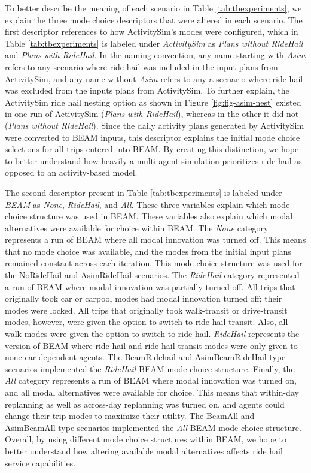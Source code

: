 \documentclass[12pt, oneside, openright]{byuthesis}
\begin{document}
To better describe the meaning of each scenario in Table \ref{tab:tbexperiments}, we explain the three mode choice descriptors that were altered in each scenario. The first descriptor references to how ActivitySim's modes were configured, which in Table \ref{tab:tbexperiments} is labeled under \emph{ActivitySim} as \emph{Plans without RideHail} and \emph{Plans with RideHail}. In the naming convention, any name starting with \emph{Asim} refers to any scenario where ride hail was included in the input plans from ActivitySim, and any name without \emph{Asim} refers to any a scenario where ride hail was excluded from the inputs plans from ActivitySim. To further explain, the ActivitySim ride hail nesting option as shown in Figure \ref{fig:fig-asim-nest} existed in one run of ActivitySim (\emph{Plans with RideHail}), whereas in the other it did not (\emph{Plans without RideHail}). Since the daily activity plans generated by ActivitySim were converted to BEAM inputs, this descriptor explains the initial mode choice selections for all trips entered into BEAM. By creating this distinction, we hope to better understand how heavily a multi-agent simulation prioritizes ride hail as opposed to an activity-based model.

The second descriptor present in Table \ref{tab:tbexperiments} is labeled under \emph{BEAM} as \emph{None}, \emph{RideHail}, and \emph{All}. These three variables explain which mode choice structure was used in BEAM. These variables also explain which modal alternatives were available for choice within BEAM. The \emph{None} category represents a run of BEAM where all modal innovation was turned off. This means that no mode choice was available, and the modes from the initial input plans remained constant across each iteration. This mode choice structure was used for the NoRideHail and AsimRideHail scenarios. The \emph{RideHail} category represented a run of BEAM where modal innovation was partially turned off. All trips that originally took car or carpool modes had modal innovation turned off; their modes were locked. All trips that originally took walk-transit or drive-transit modes, however, were given the option to switch to ride hail transit. Also, all walk modes were given the option to switch to ride hail. \emph{RideHail} represents the version of BEAM where ride hail and ride hail transit modes were only given to none-car dependent agents. The BeamRidehail and AsimBeamRideHail type scenarios implemented the \emph{RideHail} BEAM mode choice structure. Finally, the \emph{All} category represents a run of BEAM where modal innovation was turned on, and all modal alternatives were available for choice. This means that within-day replanning as well as across-day replanning was turned on, and agents could change their trip modes to maximize their utility. The BeamAll and AsimBeamAll type scenarios implemented the \emph{All} BEAM mode choice structure. Overall, by using different mode choice structures within BEAM, we hope to better understand how altering available modal alternatives affects ride hail service capabilities.
\end{document}
